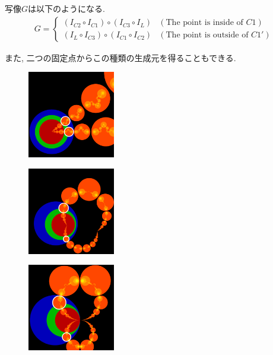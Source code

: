 写像$G$は以下のようになる.
\begin{align*}
G =
\begin{cases}
 (I_{C2} \circ I_{C1}) \circ (I_{C3} \circ I_L) & (\text{The point is inside of } C1) \\
 (I_L \circ I_{C3}) \circ (I_{C1} \circ I_{C2}) & (\text{The point is outside of }C1')
\end{cases}
\end{align*}

また, 二つの固定点からこの種類の生成元を得ることもできる.

\begin{figure}[htbp]
 \begin{minipage}[]{0.65\hsize}
  \begin{minipage}[]{0.22\hsize}
   \center
   \includegraphics[width=1.5in, height=1.5in, keepaspectratio]{../img/klein/2diis/scalingEdged.pdf}
   \label{fig:scaling2d}
  \end{minipage}
 \hspace*{\fill}
  \begin{minipage}[]{0.22\hsize}
   \center
   \includegraphics[width=1.5in, height=1.5in, keepaspectratio]{../img/klein/2diis/hyperbolicEdged.pdf}
   \label{fig:hyperbolic2d}
  \end{minipage}
 \hspace*{\fill}
  \begin{minipage}[]{0.22\hsize}
   \center
   \includegraphics[width=1.5in, height=1.5in, keepaspectratio]{../img/klein/2diis/parabolicEdged.pdf}

\end{minipage}
\end{minipage}
\end{figure}
